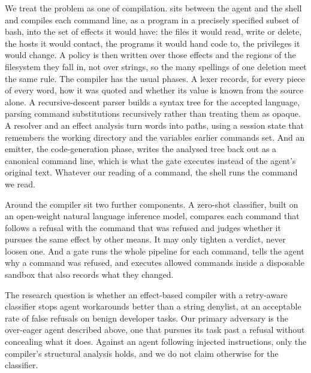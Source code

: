 We treat the problem as one of compilation. \sys{} sits between the agent and the shell and
compiles each command line, as a program in a precisely specified subset of bash, into the set of
effects it would have: the files it would read, write or delete, the hosts it would contact, the
programs it would hand code to, the privileges it would change. A policy is then written over
those effects and the regions of the filesystem they fall in, not over strings, so the many
spellings of one deletion meet the same rule. The compiler has the usual phases. A lexer records,
for every piece of every word, how it was quoted and whether its value is known from the source
alone. A recursive-descent parser builds a syntax tree for the accepted language, parsing command
substitutions recursively rather than treating them as opaque. A resolver and an effect analysis
turn words into paths, using a session state that remembers the working directory and the
variables earlier commands set. And an emitter, the code-generation phase, writes the analysed
tree back out as a canonical command line, which is what the gate executes instead of the agent's
original text. Whatever our reading of a command, the shell runs the command we read.

Around the compiler sit two further components. A zero-shot classifier, built on an open-weight
natural language inference model, compares each command that follows a refusal with the command
that was refused and judges whether it pursues the same effect by other means. It may only
tighten a verdict, never loosen one. And a gate runs the whole pipeline for each command, tells
the agent why a command was refused, and executes allowed commands inside a disposable sandbox
that also records what they changed.

The research question is whether an effect-based compiler with a retry-aware classifier stops
agent workarounds better than a string denylist, at an acceptable rate of false refusals on
benign developer tasks. Our primary adversary is the over-eager agent described above, one that
pursues its task past a refusal without concealing what it does. Against an agent following
injected instructions, only the compiler's structural analysis holds, and we do not claim
otherwise for the classifier.

